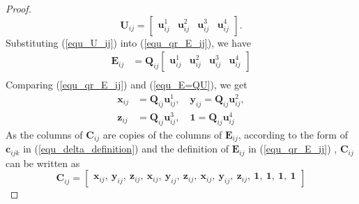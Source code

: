 \documentclass{vgtc}                          %
\begin{document}
\begin{proof}
	 \begin{equation} \label{equ_U_ij}
	 	\mathbf{U}_{ij}  = \begin{bmatrix}
	 		\mathbf{u}_{ij}^{1} & \mathbf{u}_{ij}^{2} & \mathbf{u}_{ij}^{3} & \mathbf{u}_{ij}^{4}  
	 	\end{bmatrix}.
	 \end{equation}
	 Substituting (\ref{equ_U_ij}) into (\ref{equ_qr_E_ij}), we have
	 \begin{equation} \label{equ_E=QU}
	 	\begin{split}
			\mathbf{E}_{ij} 
			& = \mathbf{Q}_{ij}\begin{bmatrix}
			\mathbf{u}_{ij}^{1} & \mathbf{u}_{ij}^{2} & \mathbf{u}_{ij}^{3} & \mathbf{u}_{ij}^{4}  
			\end{bmatrix} \\
	 	\end{split}
	 \end{equation}
	 Comparing (\ref{equ_qr_E_ij}) and (\ref{equ_E=QU}), we get
	 \begin{equation} \label{equ_xyz1}
	 	\begin{split}
	 		\mathbf{x}_{ij} &= \mathbf{Q}_{ij}\mathbf{u}_{ij}^{1}, \quad
	 		\mathbf{y}_{ij} = \mathbf{Q}_{ij}\mathbf{u}_{ij}^{2}, \\
	 		\mathbf{z}_{ij} &= \mathbf{Q}_{ij}\mathbf{u}_{ij}^{3}, \quad
	 		\mathbf{1} = \mathbf{Q}_{ij}\mathbf{u}_{ij}^{4}
	 	\end{split}
	 \end{equation}
	As  the columns of $\mathbf{C}_{ij}$ are copies of the columns of $\mathbf{E}_{ij}$, according to the form of $\mathbf{c}_{ijk}$ in (\ref{equ_delta_definition}) and the definition of $\mathbf{E}_{ij}$ in (\ref{equ_qr_E_ij}) , $\mathbf{C}_{ij}$ can be written as
	\begin{equation} \label{equ_C_ij_col}
			\mathbf{C}_{ij}  =\begin{bmatrix}
			\mathbf{x}_{ij} , \  \mathbf{y}_{ij}, \ \mathbf{z}_{ij}, \ \mathbf{x}_{ij}, \  \mathbf{y}_{ij}, \ \mathbf{z}_{ij}, \  \mathbf{x}_{ij}, \  \mathbf{y}_{ij}, \ \mathbf{z}_{ij}, \  \mathbf{1}, \     \mathbf{1}, \  \mathbf{1}, \  \mathbf{1}
			\end{bmatrix}
	\end{equation}

\end{proof}
\end{document}
